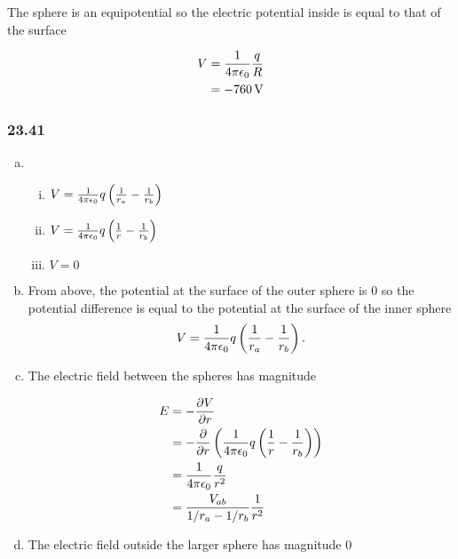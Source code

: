 \documentclass{article}
\begin{document}
The sphere is an equipotential so the electric potential inside is equal to that of the surface

\begin{align*}
  V & = \frac{1}{4 \pi \epsilon_0} \frac{q}{R} \\
    & = \qty{-760}{V}
\end{align*}

\subsubsection{23.41}

\begin{enumerate}[a)]
  \item

        \begin{enumerate}[i)]
          \item $V = \frac{1}{4 \pi \epsilon_0} q \left( \frac{1}{r_a} - \frac{1}{r_b} \right)$

          \item $V = \frac{1}{4 \pi \epsilon_0} q \left( \frac{1}{r} - \frac{1}{r_b} \right)$

          \item $V = 0$
        \end{enumerate}

  \item From above, the potential at the surface of the outer sphere is $0$ so the potential difference is equal to the potential at the surface of the inner sphere \[V = \frac{1}{4 \pi \epsilon_0} q \left( \frac{1}{r_a} - \frac{1}{r_b} \right).\]

  \item The electric field between the spheres has magnitude

        \begin{align*}
          E & = -\frac{\partial V}{\partial r}                                                               \\
            & = -\frac{\partial}{\partial r} \left( \frac{1}{4 \pi \epsilon_0} q \left( \frac{1}{r} - \frac{1}{r_b} \right) \right) \\
            & = \frac{1}{4 \pi \epsilon_0} \frac{q}{r^2}                                                                            \\
            & = \frac{V_{ab}}{1/r_a - 1/r_b} \frac{1}{r^2}
        \end{align*}

  \item The electric field outside the larger sphere has magnitude $0$
\end{enumerate}
\end{document}
